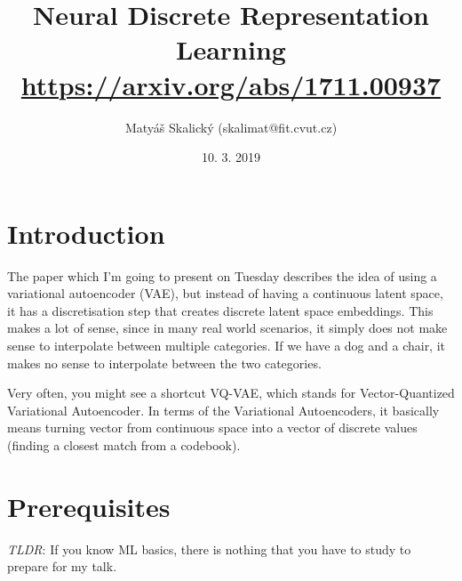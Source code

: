 \documentclass{article}
\title{Neural Discrete Representation Learning\cite{van2017neural} \\
	\Large \href{https://arxiv.org/abs/1711.00937}{https://arxiv.org/abs/1711.00937}}
\author{Matyáš Skalický (skalimat@fit.cvut.cz)}
\date{\vspace{-1em}10. 3. 2019}
\begin{document}
\maketitle

\section{Introduction}
The paper\cite{van2017neural} which I'm going to present on Tuesday describes the idea of using a variational autoencoder (VAE), but instead of having a continuous latent space, it has a discretisation step that creates discrete latent space embeddings. This makes a lot of sense, since in many real world scenarios, it simply does not make sense to interpolate between multiple categories. If we have a dog and a chair, it makes no sense to interpolate between the two categories.

Very often, you might see a shortcut VQ-VAE, which stands for Vector-Quantized Variational Autoencoder. In terms of the Variational Autoencoders, it basically means turning vector from continuous space into a vector of discrete values (finding a closest match from a codebook).

\section{Prerequisites}
\emph{TLDR}: If you know ML basics, there is nothing that you have to study to prepare for my talk.
\end{document}
